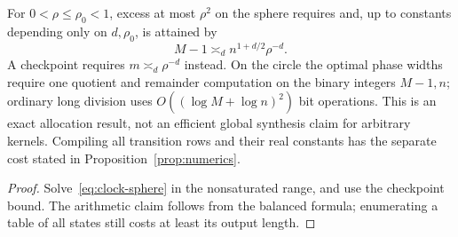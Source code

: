 \begin{corollary}\label{cor:resolution-clock}
For $0<\rho\le\rho_0<1$, excess at most $\rho^2$ on the sphere requires and, up to constants depending only on $d,\rho_0$, is attained by
\[
 M-1\asymp_d n^{1+d/2}\rho^{-d}.
\]
A checkpoint requires $m\asymp_d\rho^{-d}$ instead. On the circle the optimal phase widths require one quotient and remainder computation on the binary integers $M-1,n$; ordinary long division uses $O((\log M+\log n)^2)$ bit operations. This is an exact allocation result, not an efficient global synthesis claim for arbitrary kernels. Compiling all transition rows and their real constants has the separate cost stated in Proposition~\ref{prop:numerics}.
\end{corollary}
\begin{proof}
Solve~\eqref{eq:clock-sphere} in the nonsaturated range, and use the checkpoint bound. The arithmetic claim follows from the balanced formula; enumerating a table of all states still costs at least its output length.
\end{proof}
